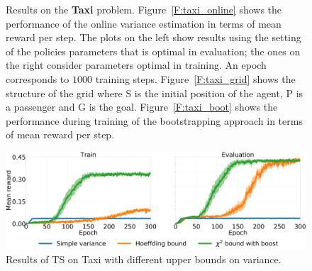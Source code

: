 \begin{figure}[t]
\begin{minipage}{.33\textwidth}
\begin{center}
\end{center}
\end{minipage}
\caption[Taxi problem results]{Results on the \textbf{Taxi} problem. Figure~\ref{F:taxi_online} shows the performance of the online variance estimation in terms of mean reward per step. The plots on the left show results using the setting of the policies parameters that is optimal in evaluation; the ones on the right consider parameters optimal in training. An epoch corresponds to $1000$ training steps. Figure~\ref{F:taxi_grid} shows the structure of the grid where S is the initial position of the agent, P is a passenger and G is the goal. Figure~\ref{F:taxi_boot} shows the performance during training of the bootstrapping approach in terms of mean reward per step.}\label{F:taxi}
\end{figure}
\begin{figure}[t]
\begin{minipage}{\textwidth}
\begin{center}
  \includegraphics[scale=.05]{img/bounds.pdf}
\end{center}
\end{minipage}
\caption[Taxi with different upper bounds results - 1]{Results of TS on Taxi with different upper bounds on variance.}\label{F:bounds}
\end{figure}
